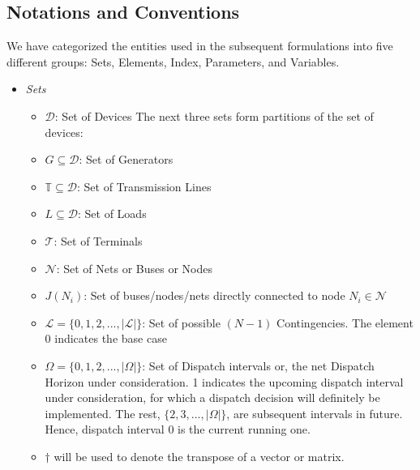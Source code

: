\documentclass[preprint,12pt,3p]{elsarticle}
\begin{document}
\subsection{Notations and Conventions}
\label{notations}
We have categorized the entities used in the subsequent formulations into five different groups: Sets, Elements, Index, Parameters, and Variables.\\
\begin{itemize}
    \item \textit{Sets}
    \begin{itemize}[label={}]
        \item $\mathcal{D}$: Set of Devices
        The next three sets form partitions of the set of devices:
        \item $G\subseteq\mathcal{D}$: Set of Generators
        \item $\mathbb{T}\subseteq\mathcal{D}$: Set of Transmission Lines
        \item $L\subseteq\mathcal{D}$: Set of Loads
        \item $\mathcal{T}$: Set of Terminals
        \item $\mathcal{N}$: Set of Nets or Buses or Nodes
        \item $J(N_i)$: Set of buses/nodes/nets directly connected to node $N_i\in\mathcal{N}$
        \item $\mathcal{L}=\{0,1,2,...,|\mathcal{L}|\}$: Set of possible $(N-1)$ Contingencies. The element 0 indicates the base case
        \item $\Omega=\{0, 1, 2, ..., |\Omega|\}$: Set of Dispatch intervals or, the net Dispatch Horizon under consideration. 1 indicates the upcoming dispatch interval under consideration, for which a dispatch decision will definitely be implemented. The rest, $\{2, 3, ..., |\Omega|\}$, are subsequent intervals in future. Hence, dispatch interval $0$  is the current running one. 
        \item $\dagger$ will be used to denote the transpose of a vector or matrix.

\end{itemize}
\end{itemize}
\end{document}
